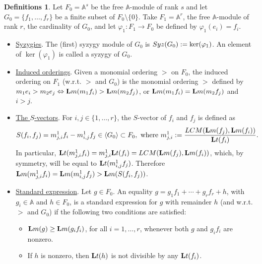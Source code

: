 \documentclass[10pt]{amsart}
\newcommand{\mba}{\mbox{$\mathbb{A}$}}
\newcommand{\lm}{\mbox{${\bf L}{\rm m}$}}
\newcommand{\lt}{\mbox{${\bf L}{\rm t}$}}
\newcommand{\syz}{\mbox{${\rm Syz}$}}
\newcommand{\Lcm}{\mbox{${\rm LCM}$}}
\theoremstyle{definition}
\newtheorem{definitions}[cdrthm]{Definitions}
\theoremstyle{remark}
\begin{document}
\begin{definitions}\label{secondsetofdefinitions}
Let $F_0=\mba^s$ be the free $\mba$-module of rank $s$ and let
$G_0=\{f_1,\ldots ,f_r\}$ be a finite subset of
$F_0\setminus\{0\}$. Take $F_1=\mba^r$, the free $\mba$-module of rank $r$,
the cardinality of $G_0$, and let $\varphi_1:F_1\rightarrow F_0$ be
defined by $\varphi_1(e_i)=f_i$.
\begin{itemize}
\item[$(5)$] \underline{\sc Syzygies}. The (first) syzygy module of
  $G_0$ is $\syz(G_0):=\ker(\varphi_1)$. An element of $\ker(\varphi_1)$ is
  called a syzygy of $G_0$.
\item[$(6)$] \underline{\sc Induced orderings}. Given a monomial
  ordering $>$ on $F_0$, the induced ordering on $F_1$ (w.r.t. $>$ and
  $G_0$) is the monomial ordering $>$ defined by
  $m_1e_i>m_2e_j\Leftrightarrow \lm(m_1f_i)>\lm(m_2f_j)$, or
  $\lm(m_1f_i)=\lm(m_2f_j)$ and $i>j$.
\item[$(7)$] \underline{\sc The $S$-vectors}. For $i,j\in\{ 1,\ldots
  ,r\}$, the $S$-vector of $f_i$ and $f_j$ is defined as
\begin{eqnarray*}
S(f_i,f_j)=m^1_{j,i}f_i-m^1_{i,j}f_j\in \langle G_0 \rangle\subset
F_0,\mbox{ where } m^1_{j,i}:=\frac{\Lcm(\lm(f_j),\lm(f_i))}{\lt(f_i)}.
\end{eqnarray*}
In particular,
$\lt(m^1_{j,i}f_i)=m^1_{j,i}\lt(f_i)=\Lcm(\lm(f_j),\lm(f_i))$, which,
by symmetry, will be equal to $\lt(m^1_{i,j}f_j)$. Therefore
$\lm(m^1_{j,i}f_i)=\lm(m^1_{i,j}f_j)>\lm(S(f_i,f_j))$.
\item[$(8)$] \underline{\sc Standard expression}. Let $g\in F_0$. An
  equality $g=g_1f_1+\cdots +g_rf_r+h$, with $g_i\in \mba$ and $h\in
  F_0$, is a standard expression for $g$ with remainder $h$ (and
  w.r.t. $>$ and $G_0$) if the following two conditions are satisfied:
\begin{itemize}
\item[$(a)$] $\lm(g)\geq \lm(g_if_i)$, for all $i=1,\ldots ,r$,
  whenever both $g$ and $g_if_i$ are nonzero.
\item[$(b)$] If $h$ is nonzero, then $\lt(h)$ is not divisible by any
  $\lt(f_i)$.
\end{itemize}
\end{itemize}
\end{definitions}
\end{document}

